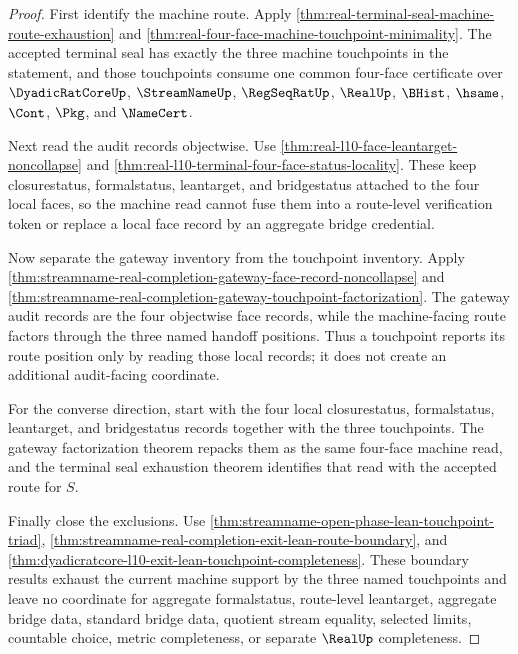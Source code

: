 \begin{proof}
First identify the machine route. Apply \autoref{thm:real-terminal-seal-machine-route-exhaustion} and \autoref{thm:real-four-face-machine-touchpoint-minimality}. The accepted terminal seal has exactly the three machine touchpoints in the statement, and those touchpoints consume one common four-face certificate over $\DyadicRatCoreUp$, $\StreamNameUp$, $\RegSeqRatUp$, $\RealUp$, $\BHist$, $\hsame$, $\Cont$, $\Pkg$, and $\NameCert$.

Next read the audit records objectwise. Use \autoref{thm:real-l10-face-leantarget-noncollapse} and \autoref{thm:real-l10-terminal-four-face-status-locality}. These keep closurestatus, formalstatus, leantarget, and bridgestatus attached to the four local faces, so the machine read cannot fuse them into a route-level verification token or replace a local face record by an aggregate bridge credential.

Now separate the gateway inventory from the touchpoint inventory. Apply \autoref{thm:streamname-real-completion-gateway-face-record-noncollapse} and \autoref{thm:streamname-real-completion-gateway-touchpoint-factorization}. The gateway audit records are the four objectwise face records, while the machine-facing route factors through the three named handoff positions. Thus a touchpoint reports its route position only by reading those local records; it does not create an additional audit-facing coordinate.

For the converse direction, start with the four local closurestatus, formalstatus, leantarget, and bridgestatus records together with the three touchpoints. The gateway factorization theorem repacks them as the same four-face machine read, and the terminal seal exhaustion theorem identifies that read with the accepted route for $S$.

Finally close the exclusions. Use \autoref{thm:streamname-open-phase-lean-touchpoint-triad}, \autoref{thm:streamname-real-completion-exit-lean-route-boundary}, and \autoref{thm:dyadicratcore-l10-exit-lean-touchpoint-completeness}. These boundary results exhaust the current machine support by the three named touchpoints and leave no coordinate for aggregate formalstatus, route-level leantarget, aggregate bridge data, standard bridge data, quotient stream equality, selected limits, countable choice, metric completeness, or separate $\RealUp$ completeness.
\end{proof}
